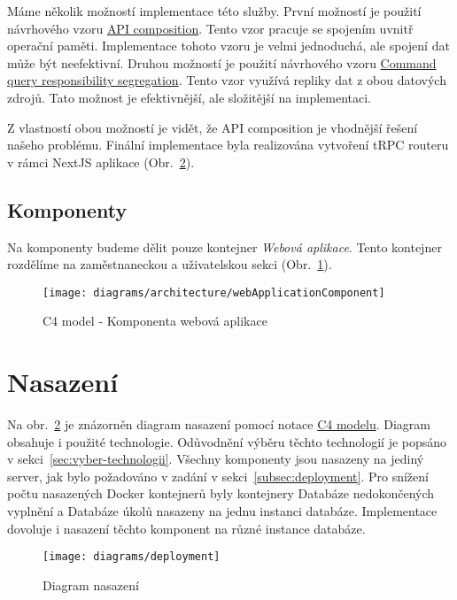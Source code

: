 Máme několik možností implementace této služby.
První možností je použití návrhového vzoru \href{https://microservices.io/patterns/data/api-composition.html}{API composition}.
Tento vzor pracuje se spojením uvnitř operační paměti.
Implementace tohoto vzoru je velmi jednoduchá, ale spojení dat může být neefektivní.
Druhou možností je použití návrhového vzoru \href{https://microservices.io/patterns/data/cqrs.html}{Command query responsibility segregation}.
Tento vzor využívá repliky dat z obou datových zdrojů.
Tato možnost je efektivnější, ale složitější na implementaci.

Z vlastností obou možností je vidět, že API composition je vhodnější řešení našeho problému.
Finální implementace byla realizována vytvoření tRPC routeru v rámci NextJS aplikace (Obr.~\ref{fig:deployment}).

\subsection{Komponenty}\label{subsec:komponenty}

Na komponenty budeme dělit pouze kontejner \textit{Webová aplikace}.
Tento kontejner rozdělíme na zaměstnaneckou a uživatelskou sekci (Obr.~\ref{fig:architecture-component-web-application}).

\begin{figure}[H]
    \centering
    \texttt{[image: diagrams/architecture/webApplicationComponent]}
    \caption{C4 model - Komponenta webová aplikace}\label{fig:architecture-component-web-application}
\end{figure}


\section{Nasazení}\label{sec:deployment}

Na obr.~\ref{fig:deployment} je znázorněn diagram nasazení pomocí notace \href{https://c4model.com/#DeploymentDiagram}{C4 modelu}.
Diagram obsahuje i použité technologie.
Odůvodnění výběru těchto technologií je popsáno v sekci~\ref{sec:vyber-technologii}.
Všechny komponenty jsou nasazeny na jediný server, jak bylo požadováno v zadání v sekci~\ref{subsec:deployment}.
Pro snížení počtu nasazených Docker kontejnerů byly kontejnery Databáze nedokončených vyplnění a Databáze úkolů nasazeny na jednu instanci databáze.
Implementace dovoluje i nasazení těchto komponent na různé instance databáze.

\begin{figure}[H]
    \centering
    \texttt{[image: diagrams/deployment]}
    \caption{Diagram nasazení}\label{fig:deployment}
\end{figure}



